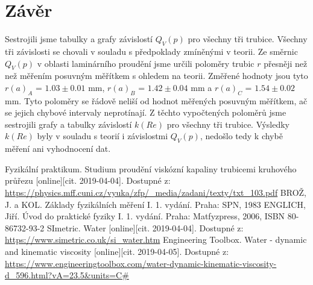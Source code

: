 \documentclass[a4paper]{article}
\begin{document}
\section*{Závěr}
\par Sestrojili jsme tabulky a grafy závislostí $Q_{V}(p)$ pro všechny tři trubice. Všechny tři závislosti se chovali v souladu s předpoklady zmíněnými v teorii. Ze směrnic $Q_{V}(p)$ v oblasti laminárního proudění jsme určili poloměry trubic $r$ přesněji než než měřením posuvným měřítkem s ohledem na teorii. Změřené hodnoty jsou tyto $r(a)_{A}$ = $1.03\pm0.01$ mm, $r(a)_{B}$ = $1.42\pm0.04$ mm a $r(a)_{C}$ = $1.54\pm0.02$ mm. Tyto poloměry se řádově neliší od hodnot měřených posuvným měřítkem, ač se jejich chybové intervaly neprotínají. Z těchto vypočtených poloměrů jsme sestrojili grafy a tabulky závislostí $k(Re)$ pro všechny tři trubice. Výsledky $k(Re)$ byly v souladu s teorií i závislostmi $Q_{V}(p)$, nedošlo tedy k chybě měření ani vyhodnocení dat. 

\renewcommand\refname{Použitá literatura}
\begin{thebibliography}{}
Fyzikální praktikum. Studium proudění viskózní kapaliny trubicemi kruhového
průřezu [online][cit. 2019-04-04]. Dostupné z:
\url{https://physics.mff.cuni.cz/vyuka/zfp/_media/zadani/texty/txt_103.pdf}
BROŽ, J. a KOL. Základy fyzikálních měření I. 1. vydání. Praha: SPN, 1983
ENGLICH, Jiří. Úvod do praktické fyziky I. 1. vydání. Praha: Matfyzpress, 2006, ISBN 80-86732-93-2
SImetric. Water [online][cit. 2019-04-04]. Dostupné z:
\url{https://www.simetric.co.uk/si_water.htm}
Engineering Toolbox. Water - dynamic and kinematic viscosity [online][cit. 2019-04-05]. Dostupné z:
\url{https://www.engineeringtoolbox.com/water-dynamic-kinematic-viscosity-d_596.html?vA=23.5&units=C#}
\end{thebibliography}
\end{document}
